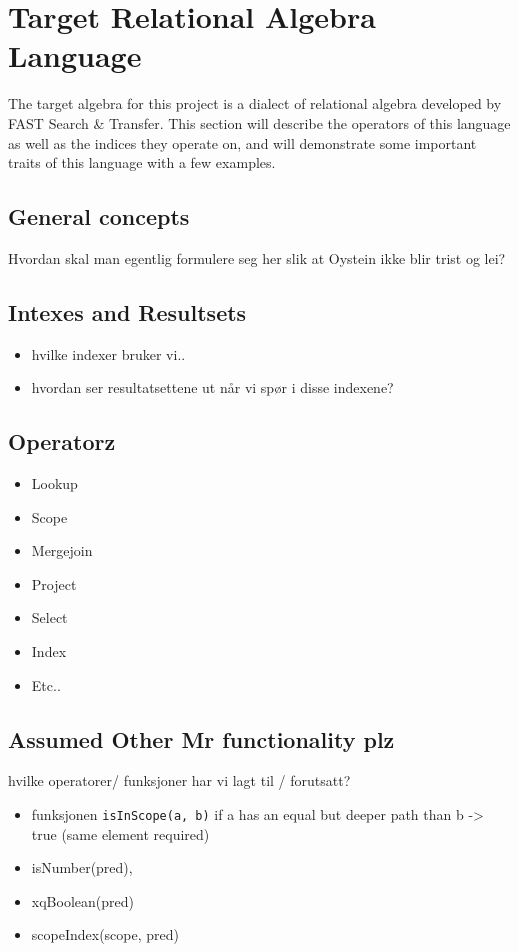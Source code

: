 \section{Target Relational Algebra Language}
The target algebra for this project is a dialect of relational algebra
developed by FAST Search \& Transfer. This section will describe the operators
of this language as well as the indices they operate on, and will demonstrate some 
important traits of this language with a few examples.

\subsection{General concepts}
Hvordan skal man egentlig formulere seg her slik at Oystein ikke blir trist og
lei?

\subsection{Intexes and Resultsets}
\begin{itemize}
  \item hvilke indexer bruker vi..
  \item hvordan ser resultatsettene ut n\aa r vi sp\o r i disse indexene?
\end{itemize}


\subsection{Operatorz}
\label{sect:method:marsOperators}

\begin{itemize}
  \item Lookup
  \item Scope
  \item Mergejoin
  \item Project
  \item Select
  \item Index
  \item Etc..
\end{itemize}

\subsection{Assumed Other Mr functionality plz}
\label{sect:method:marsAddedOperators}
hvilke operatorer/ funksjoner har vi lagt til / forutsatt?
\begin{itemize}
  	\item funksjonen \verb!isInScope(a, b)! if a has an equal but deeper path than
		b -> true (same element required) 
	\item isNumber(pred), 
	\item xqBoolean(pred)
	\item scopeIndex(scope, pred)
\end{itemize}
